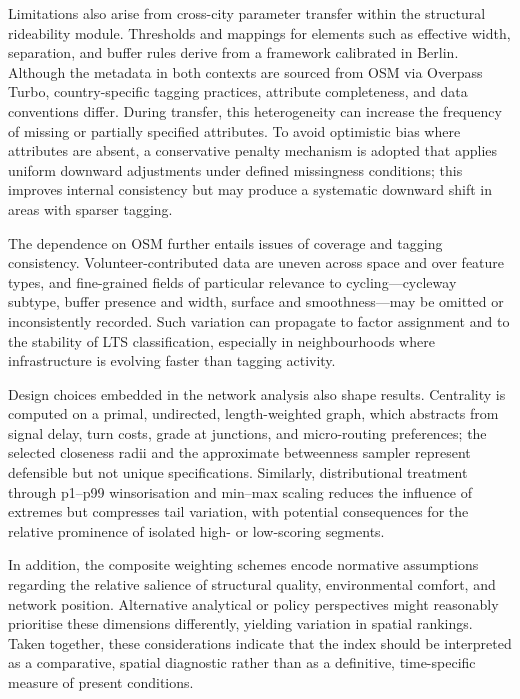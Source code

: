 \documentclass[
  12pt,
  oneside]{book}
\begin{document}
Limitations also arise from cross-city parameter transfer within the structural rideability module. Thresholds and mappings for elements such as effective width, separation, and buffer rules derive from a framework calibrated in Berlin. Although the metadata in both contexts are sourced from OSM via Overpass Turbo, country-specific tagging practices, attribute completeness, and data conventions differ. During transfer, this heterogeneity can increase the frequency of missing or partially specified attributes. To avoid optimistic bias where attributes are absent, a conservative penalty mechanism is adopted that applies uniform downward adjustments under defined missingness conditions; this improves internal consistency but may produce a systematic downward shift in areas with sparser tagging.

The dependence on OSM further entails issues of coverage and tagging consistency. Volunteer-contributed data are uneven across space and over feature types, and fine-grained fields of particular relevance to cycling---cycleway subtype, buffer presence and width, surface and smoothness---may be omitted or inconsistently recorded. Such variation can propagate to factor assignment and to the stability of LTS classification, especially in neighbourhoods where infrastructure is evolving faster than tagging activity.

Design choices embedded in the network analysis also shape results. Centrality is computed on a primal, undirected, length-weighted graph, which abstracts from signal delay, turn costs, grade at junctions, and micro-routing preferences; the selected closeness radii and the approximate betweenness sampler represent defensible but not unique specifications. Similarly, distributional treatment through p1--p99 winsorisation and min--max scaling reduces the influence of extremes but compresses tail variation, with potential consequences for the relative prominence of isolated high- or low-scoring segments.

In addition, the composite weighting schemes encode normative assumptions regarding the relative salience of structural quality, environmental comfort, and network position. Alternative analytical or policy perspectives might reasonably prioritise these dimensions differently, yielding variation in spatial rankings. Taken together, these considerations indicate that the index should be interpreted as a comparative, spatial diagnostic rather than as a definitive, time-specific measure of present conditions.
\end{document}
